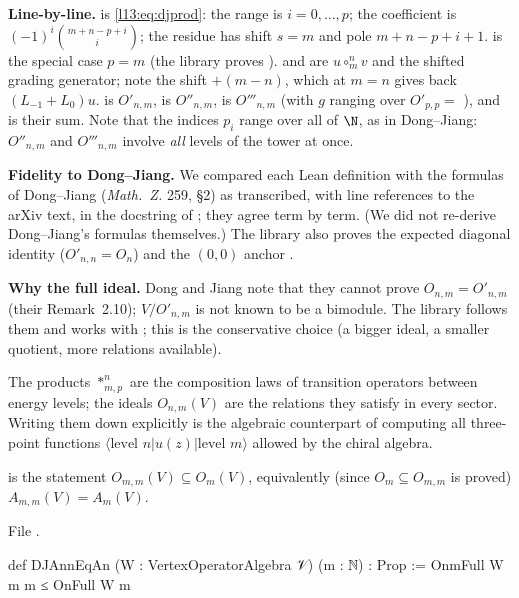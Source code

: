 \begin{dictionary}
\textbf{Line-by-line.}  is \eqref{l13:eq:djprod}: the range  is
$i = 0,\dots,p$; the coefficient is $(-1)^i\binom{m+n-p+i}{i}$; the residue has shift $s = m$ and pole $m+n-p+i+1$.
 is the special case $p = m$ (the library proves ).  and 
are $u\circ^n_mv$ and the shifted grading generator; note the shift $+(m-n)$, which at $m = n$ gives back $(L_{-1}+L_0)u$.
 is $O'_{n,m}$,  is $O''_{n,m}$,  is $O'''_{n,m}$ (with $g$ ranging over
$O'_{p,p} = $ ), and  is their sum. Note that the indices $p_i$ range over all of $\N$, as in
Dong--Jiang: $O''_{n,m}$ and $O'''_{n,m}$ involve \emph{all} levels of the tower at once.

\textbf{Fidelity to Dong--Jiang.} We compared each Lean definition with the formulas of Dong--Jiang (\emph{Math.\ Z.} 259, §2)
as transcribed, with line references to the arXiv text, in the docstring of ; they agree
term by term. (We did not re-derive Dong--Jiang's formulas themselves.) The library
also proves the expected diagonal identity  ($O'_{n,n} = O_n$) and the
$(0,0)$ anchor .

\textbf{Why the full ideal.} Dong and Jiang note that they cannot prove $O_{n,m} = O'_{n,m}$ (their Remark~2.10); $V/O'_{n,m}$
is not known to be a bimodule. The library follows them and works with ; this is the conservative choice (a
bigger ideal, a smaller quotient, more relations available).
\end{dictionary}

\begin{physics}
The products $*^n_{m,p}$ are the composition laws of transition operators between energy levels; the ideals $O_{n,m}(V)$ are the
relations they satisfy in every sector. Writing them down explicitly is the algebraic counterpart of computing all three-point
functions $\langle\text{level }n|u(z)|\text{level }m\rangle$ allowed by the chiral algebra.
\end{physics}

\begin{definition}\label{l13:def:djann}
 is the statement $O_{m,m}(V)\subseteq O_m(V)$, equivalently (since $O_m\subseteq O_{m,m}$ is proved)
$A_{m,m}(V) = A_m(V)$.
\end{definition}
\noindent File .
\begin{leancode}
def DJAnnEqAn (W : VertexOperatorAlgebra 𝒱) (m : ℕ) : Prop :=
  OnmFull W m m ≤ OnFull W m
\end{leancode}

